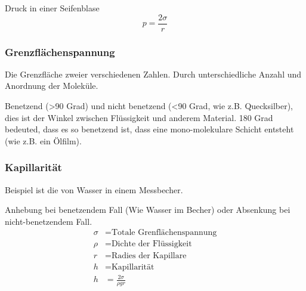 Druck in einer Seifenblase
\[
    p = \frac{2\sigma}{r}
\]


\subsubsection{Grenzflächenspannung}
Die Grenzfläche zweier verschiedenen Zahlen. Durch unterschiedliche Anzahl und Anordnung der Moleküle.

Benetzend (>90 Grad) und nicht benetzend (<90 Grad, wie z.B. Quecksilber), dies ist der Winkel zwischen Flüssigkeit und anderem Material. 180 Grad bedeuted, dass es so benetzend ist, dass eine mono-molekulare
Schicht entsteht (wie z.B. ein Ölfilm).

\subsubsection{Kapillarität}
Beispiel ist die  von Wasser in einem Messbecher.

Anhebung bei benetzendem Fall (Wie Wasser im Becher) oder Absenkung bei nicht-benetzendem Fall.
\begin{align*}
    \sigma &= \text{Totale Grenflächenspannung}\\
    \rho &= \text{Dichte der Flüssigkeit}\\
    r &= \text{Radies der Kapillare}\\
    h&=\text{Kapillarität}\\
    h&=\frac{2\sigma}{\rho g r}
\end{align*}
